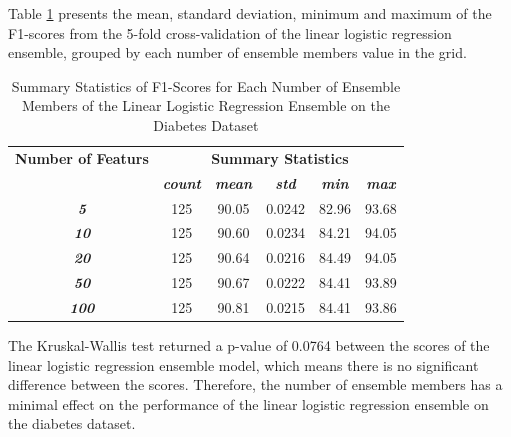 \documentclass[10pt, conference]{IEEEtran}
\begin{document}
Table \ref{table: D_member_linear_performance_metrics} presents the mean, standard deviation, minimum and maximum of the
F1-scores from the 5-fold cross-validation of the linear logistic regression ensemble, grouped by each number of ensemble members
value in the grid.
\begin{table}[H]
    \caption{Summary Statistics of F1-Scores for Each Number of Ensemble Members of the Linear Logistic Regression Ensemble on the Diabetes Dataset}
    \begin{center}
        \begin{tabular}{|c||c|c|c|c|c|}
            \hline
            \textbf{Number of Featurs}&\multicolumn{5}{|c|}{\textbf{Summary Statistics}} \\
            \cline{2-6}
                       &\textbf{\textit{count}} & \textbf{\textit{mean}} & \textbf{\textit{std}} & \textbf{\textit{min}} & \textbf{\textit{max}}\\
            \hline
            \textbf{\textit{5}}   & 125 & 90.05 & 0.0242 & 82.96 & 93.68 \\
            \textbf{\textit{10}}  & 125 & 90.60 & 0.0234 & 84.21 & 94.05 \\
            \textbf{\textit{20}}  & 125 & 90.64 & 0.0216 & 84.49 & 94.05 \\
            \textbf{\textit{50}}  & 125 & 90.67 & 0.0222 & 84.41 & 93.89 \\
            \textbf{\textit{100}} & 125 & 90.81 & 0.0215 & 84.41 & 93.86 \\
            \hline
        \end{tabular}
    \end{center}
    \label{table: D_member_linear_performance_metrics}
\end{table}
The Kruskal-Wallis test returned a p-value of 0.0764 between the scores of the linear logistic regression ensemble model,
which means there is no significant difference between the scores. Therefore, the number of ensemble members
has a minimal effect on the performance of the linear logistic regression ensemble on the diabetes dataset.
\end{document}
